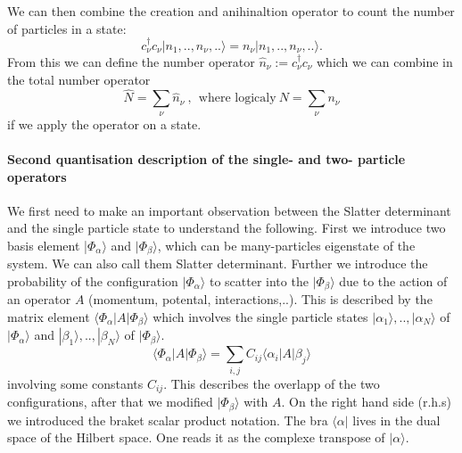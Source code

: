 \documentclass[../main.tex]{subfile}
\begin{document}
We can then combine the creation and anihinaltion operator to count the number of particles in a state:
\[
    c_{\nu}^{\dagger} c_{\nu} |n_{1},..,n_{\nu},..\rangle = n_{\nu}|n_{1},..,n_{\nu},..\rangle.
\]  
From this we can define the number operator $\hat{n}_{\nu}:= c_{\nu}^{\dagger} c_{\nu}$ which we can combine in the total number operator
\[
    \hat{N} = \sum_{\nu} \hat{n}_{\nu}~,~~\text{where logicaly}~ N = \sum_{\nu} n_{\nu}
\]
if we apply the operator on a state.\\

\paragraph{Second quantisation description of the single- and two- particle operators}
We first need to make an important observation between the Slatter determinant and the single particle state to
understand the following. First we introduce two basis element |$\Phi_{\alpha}\rangle$ and $|\Phi_{\beta}\rangle$, which can be many-particles eigenstate of the system.
We can also call them Slatter determinant.
Further we introduce the probability of the configuration $|\Phi_{\alpha}\rangle$ to scatter into the $|\Phi_{\beta}\rangle$ due to the action of an operator $A$ (momentum, potental, interactions,..).
This is described by the matrix element $\langle\Phi_{\alpha}|A|\Phi_{\beta}\rangle$ which involves the single particle states $|\alpha_1\rangle, .., |\alpha_N\rangle$ of $|\Phi_{\alpha}\rangle$
and $|\beta_1\rangle, ..,|\beta_N\rangle$ of $|\Phi_{\beta}\rangle$.
\[
    \langle\Phi_{\alpha}|A|\Phi_{\beta}\rangle = \sum_{i,j} C_{ij}\langle\alpha_i|A|\beta_j\rangle
\]
involving some constants $C_{ij}$. This describes the overlapp of the two configurations, after that we modified $|\Phi_{\beta}\rangle$ with $A$.
On the right hand side (r.h.s) we introduced the braket scalar product notation. The bra $\langle\alpha|$ lives in the dual space
of the Hilbert space. One reads it as the complexe transpose of $|\alpha\rangle$.\\
\end{document}
